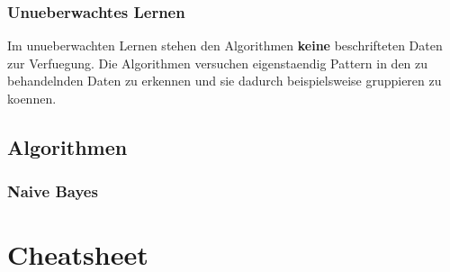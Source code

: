 \documentclass{article}
\begin{document}
\subsubsection{Unueberwachtes Lernen}
\begin{flushleft}

Im unueberwachten Lernen stehen den Algorithmen \textbf{keine} beschrifteten Daten zur Verfuegung. Die Algorithmen versuchen eigenstaendig Pattern in den zu behandelnden Daten zu erkennen und sie dadurch beispielsweise gruppieren zu koennen.
\end{flushleft}

\subsection{Algorithmen}
\subsubsection{Naive Bayes}
\begin{flushleft}
\end{flushleft}




%




\cleardoublepage


\cleardoublepage
\appendix
\section{Cheatsheet}
\end{document}

